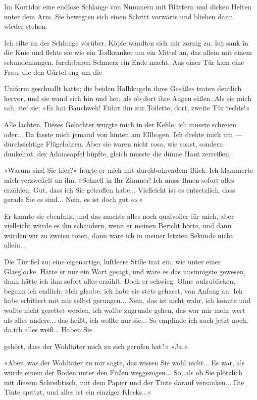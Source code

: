 Im Korridor eine endlose Schlange von Nummern mit Blättern und
dicken Heften unter dem Arm. Sie bewegten sich einen Schritt
vorwärts und blieben dann wieder stehen.

Ich eilte an der Schlange vorüber. Köpfe wandten sich mir zornig
zu. Ich sank in die Knie und flehte sie wie ein Todkranker um ein
Mittel an, das allem mit einem sekundenlangen, furchtbaren Schmerz
ein Ende macht. Aus einer Tür kam eine Frau, die den Gürtel eng um
die

Uniform geschnallt hatte; die beiden Halbkugeln ihres Gesäßes
traten deutlich hervor, und sie wand sich hin und her, als ob dort
ihre Augen säßen. Als sie mich sah, rief sie: »Er hat Bauchweh!
Führt ihn zur Toilette, dort, zweite Tür rechts!«

Alle lachten. Dieses Gelächter würgte mich in der Kehle, ich musste
schreien oder... Da fasste mich jemand von hinten am Ellbogen. Ich
drehte mich um — durchsichtige Flügelohren. Aber sie waren nicht
rosa, wie sonst, sondern dunkelrot; der Adamsapfel hüpfte, gleich
musste die dünne Haut zerreißen.

»Warum sind Sie hier?« fragte er mich mit durchbohrendem Blick. Ich
klammerte mich verzweifelt an ihn. »Schnell in Ihr Zimmer! Ich muss
Ihnen sofort alles erzählen. Gut, dass ich Sie getroffen habe...
Vielleicht ist es entsetzlich, dass gerade Sie es sind... Nein, es
ist doch gut so.«

Er kannte sie ebenfalls, und das machte alles noch qualvoller für
mich, aber vielleicht würde es ihn schaudern, wenn er meinen
Bericht hörte, und dann würden wir zu zweien töten, dann wäre ich
in meiner letzten Sekunde nicht allein...

Die Tür fiel zu; eine eigenartige, luftleere Stille trat ein, wie
unter einer Glasglocke. Hätte er nur ein Wort gesagt, und wäre es
das unsinnigste gewesen, dann hätte ich ihm sofort alles erzählt.
Doch er schwieg. Ohne aufzublicken, begann ich endlich: »Ich
glaube, ich habe sie stets gehasst, von Anfang an. Ich habe
erbittert mit mir selbst gerungen... Nein, das ist nicht wahr, ich
konnte und wollte nicht gerettet werden, ich wollte zugrunde gehen,
das war mir mehr wert als alles andere... das heißt, ich wollte nur
sie... So empfinde ich auch jetzt noch, da ich alles weiß... Haben
Sie

gehört, dass der Wohltäter mich zu sich gerufen hat?« »Ja.«

»Aber, was der Wohltäter zu mir sagte, das wissen Sie wohl nicht...
Es war, als würde einem der Boden unter den Füßen weggezogen... So,
als ob Sie plötzlich mit diesem Schreibtisch, mit dem Papier und
der Tinte darauf versänken... Die Tinte spritzt, und alles ist ein
einziger Klecks...«

